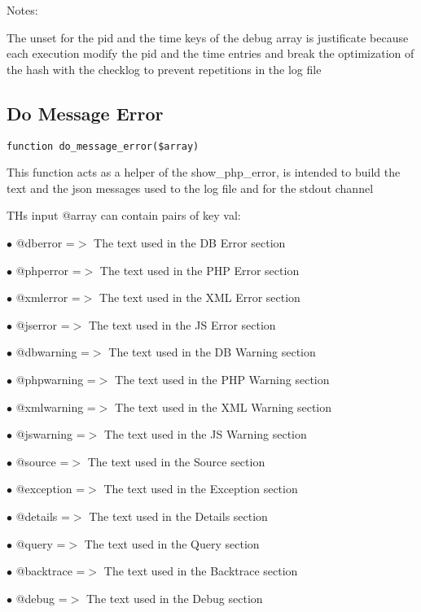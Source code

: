 \documentclass[a4paper]{book}
\begin{document}
Notes:

The unset for the pid and the time keys of the debug array is justificate
because each execution modify the pid and the time entries and break the
optimization of the hash with the checklog to prevent repetitions in the
log file

\hypertarget{toc106}{}
\subsection{Do Message Error}

\begin{lstlisting}
function do_message_error($array)
\end{lstlisting}

This function acts as a helper of the show\_php\_error, is intended to build
the text and the json messages used to the log file and for the stdout channel

THs input @array can contain pairs of key val:

\begin{compactitem}
\item[\color{myblue}$\bullet$] @dberror    =$>$ The text used in the DB Error section
\item[\color{myblue}$\bullet$] @phperror   =$>$ The text used in the PHP Error section
\item[\color{myblue}$\bullet$] @xmlerror   =$>$ The text used in the XML Error section
\item[\color{myblue}$\bullet$] @jserror    =$>$ The text used in the JS Error section
\item[\color{myblue}$\bullet$] @dbwarning  =$>$ The text used in the DB Warning section
\item[\color{myblue}$\bullet$] @phpwarning =$>$ The text used in the PHP Warning section
\item[\color{myblue}$\bullet$] @xmlwarning =$>$ The text used in the XML Warning section
\item[\color{myblue}$\bullet$] @jswarning  =$>$ The text used in the JS Warning section
\item[\color{myblue}$\bullet$] @source     =$>$ The text used in the Source section
\item[\color{myblue}$\bullet$] @exception  =$>$ The text used in the Exception section
\item[\color{myblue}$\bullet$] @details    =$>$ The text used in the Details section
\item[\color{myblue}$\bullet$] @query      =$>$ The text used in the Query section
\item[\color{myblue}$\bullet$] @backtrace  =$>$ The text used in the Backtrace section
\item[\color{myblue}$\bullet$] @debug      =$>$ The text used in the Debug section
\end{compactitem}
\end{document}
